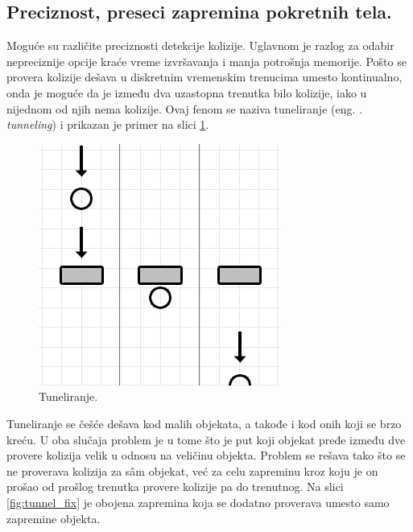 \documentclass{article}
\begin{document}
{\subsection{Preciznost, preseci zapremina pokretnih tela.}

Moguće su različite preciznosti detekcije kolizije. 
Uglavnom je razlog za odabir nepreciznije opcije kraće vreme izvršavanja i manja potrošnja memorije.
Pošto se provera kolizije dešava u diskretnim vremenskim trenucima umesto kontinualno, onda je moguće da 
je između dva uzastopna trenutka bilo kolizije, iako u nijednom od njih nema kolizije. 
Ovaj fenom se naziva tuneliranje (eng. {\em. tunneling}) i prikazan je primer na slici \ref{fig:tunnel}. 

\begin{figure}[h!]
	\begin{center}
	\includegraphics[scale=0.45]{tunnel.png}
	\end{center}
	\caption{Tuneliranje.}
	\label{fig:tunnel}
\end{figure}

Tuneliranje se češće dešava kod malih objekata, a takođe i kod 
onih koji se brzo kreću. U oba slučaja problem je u tome što je put koji objekat pređe između dve provere 
kolizija velik u odnosu na veličinu objekta. 
Problem se rešava tako što se ne proverava kolizija za sâm objekat, već za celu zapreminu kroz koju je on prošao 
od prošlog trenutka provere kolizije pa do trenutnog. Na slici \ref{fig:tunnel_fix} je obojena zapremina 
koja se dodatno proverava umesto samo zapremine objekta.



}
\end{document}
